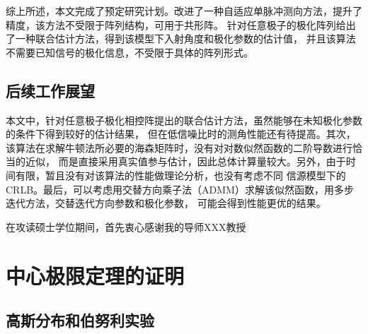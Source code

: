 \documentclass[master]{thesis-uestc}
\begin{document}
综上所述，本文完成了预定研究计划。改进了一种自适应单脉冲测向方法，提升了精度，该方法不受限于阵列结构，可用于共形阵。
针对任意极子的极化阵列给出了一种联合估计方法，得到该模型下入射角度和极化参数的估计值，
并且该算法不需要已知信号的极化信息，不受限于具体的阵列形式。

\section{后续工作展望}
本文中，针对任意极子极化相控阵提出的联合估计方法，虽然能够在未知极化参数的条件下得到较好的估计结果，
但在低信噪比时的测角性能还有待提高。其次，该算法在求解牛顿法所必要的海森矩阵时，没有对对数似然函数的二阶导数进行恰当的近似，
而是直接采用真实值参与估计，因此总体计算量较大。另外，由于时间有限，暂且没有对该算法的性能做理论分析，也没有考虑不同
信源模型下的CRLB。最后，可以考虑用交替方向乘子法（ADMM）求解该似然函数，用多步迭代方法，交替迭代方向参数和极化参数，
可能会得到性能更优的结果。

\thesisacknowledgement
在攻读硕士学位期间，首先衷心感谢我的导师XXX教授

\thesisappendix

\chapter{中心极限定理的证明}

\section{高斯分布和伯努利实验}





% 

% 
% 



\end{document}
